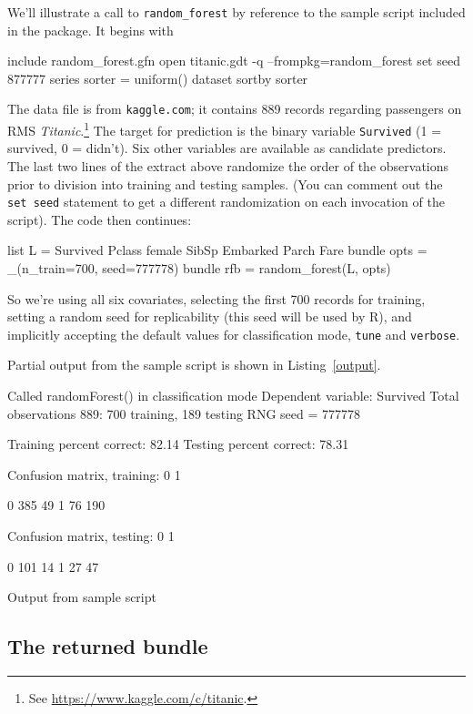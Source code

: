 \documentclass{article}
\begin{document}
We'll illustrate a call to \texttt{random\_forest} by reference to the
sample script included in the package.  It begins with
%
\begin{code}
include random_forest.gfn
open titanic.gdt -q --frompkg=random_forest
set seed 877777
series sorter = uniform()
dataset sortby sorter
\end{code}
%
The data file is from \texttt{kaggle.com}; it contains 889 records
regarding passengers on RMS \textit{Titanic}.\footnote{See
  \url{https://www.kaggle.com/c/titanic}.} The target for prediction
is the binary variable \texttt{Survived} (1 = survived, 0 =
didn't). Six other variables are available as candidate predictors.
The last two lines of the extract above randomize the order of the
observations prior to division into training and testing samples.
(You can comment out the \texttt{set seed} statement to get a
different randomization on each invocation of the script).  The code
then continues:
%
\begin{code}
list L = Survived Pclass female SibSp Embarked Parch Fare
bundle opts = _(n_train=700, seed=777778)
bundle rfb = random_forest(L, opts)
\end{code}
%
So we're using all six covariates, selecting the first 700 records for
training, setting a random seed for replicability (this seed will be
used by \textsf{R}), and implicitly accepting the default values for
classification mode, \texttt{tune} and \texttt{verbose}.

Partial output from the sample script is shown in
Listing~\ref{output}.

\begin{script}[htbp]
\begin{scodebit}
Called randomForest() in classification mode
Dependent variable: Survived
Total observations 889: 700 training, 189 testing
RNG seed = 777778

Training percent correct: 82.14
Testing percent correct:  78.31

Confusion matrix, training:
             0            1

0          385           49
1           76          190

Confusion matrix, testing:
             0            1

0          101           14
1           27           47
\end{scodebit}
  \caption{Output from sample script}
  \label{output}
\end{script}

\subsection{The returned bundle}
\end{document}
